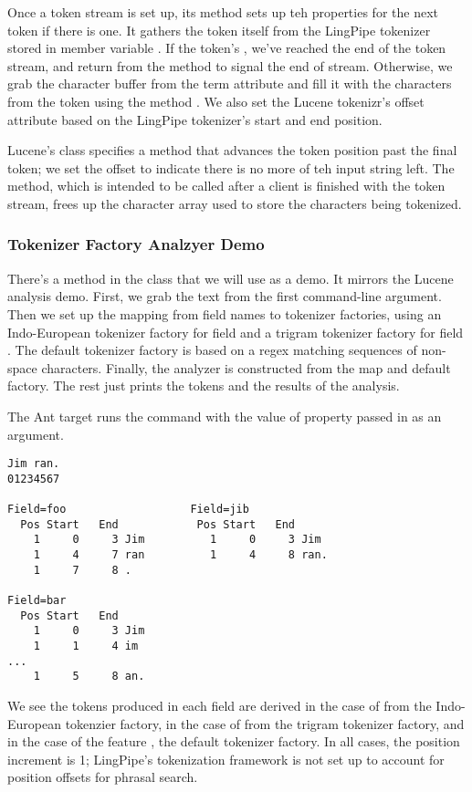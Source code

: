 Once a token stream is set up, its  method
sets up teh properties for the next token if there is one.
%
%
It gathers the token itself from the LingPipe tokenizer stored in
member variable .  If the token's , we've
reached the end of the token stream, and return  from the
 method to signal the end of stream.
Otherwise, we grab the character buffer from the term attribute and
fill it with the characters from the token using the 
method .  We also set the Lucene tokenizr's offset
attribute based on the LingPipe tokenizer's start and end position.

Lucene's  class specifies a method  that
advances the token position past the final token; we set the offset to
indicate there is no more of teh input string left.  The
 method, which is intended to be called after a client
is finished with the token stream, frees up the character array
used to store the characters being tokenized.

\subsubsection{Tokenizer Factory Analzyer Demo}

There's a  method in the 
class that we will use as a demo.  It mirrors the Lucene analysis
demo.  
%
%
First, we grab the text from the first command-line argument.  Then
we set up the mapping from field names to tokenizer factories, using
an Indo-European tokenizer factory for field  and
a trigram tokenizer factory for field .  The default
tokenizer factory is based on a regex matching sequences of
non-space characters.  Finally, the analyzer is constructed from
the map and default factory.  The rest just prints the tokens and
the results of the analysis.


The Ant target  runs the command with the
value of property  passed in as an argument.
%
\begin{verbatim}
Jim ran.
01234567

Field=foo                   Field=jib
  Pos Start   End            Pos Start   End              
    1     0     3 Jim          1     0     3 Jim
    1     4     7 ran          1     4     8 ran.
    1     7     8 .

Field=bar
  Pos Start   End
    1     0     3 Jim
    1     1     4 im
...
    1     5     8 an.
\end{verbatim}
%
We see the tokens produced in each field are derived in the case of
 from the Indo-European tokenzier factory, in the case of
 from the trigram tokenizer factory, and in the case of the
feature , the default tokenizer factory.  In all cases, the
position increment is 1; LingPipe's tokenization framework is not set up
to account for position offsets for phrasal search.


